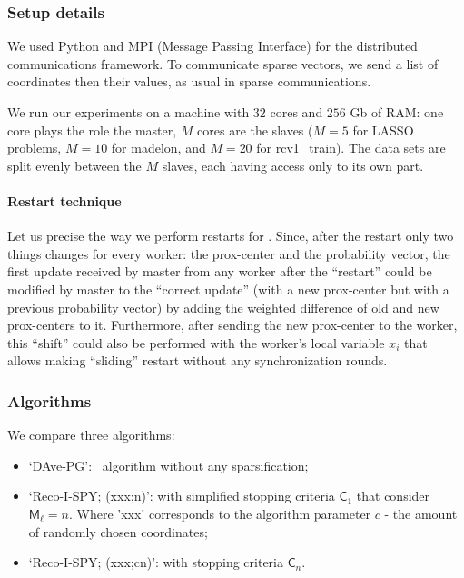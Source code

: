 \subsubsection{Setup details} We used Python and MPI (Message Passing Interface) for the distributed communications framework. To communicate sparse vectors, we send a list of coordinates then their values, as usual in sparse communications. 

We run our experiments on a machine with $32$ cores and $256$ Gb of RAM: one core plays the role the master, $M$ cores are the slaves ($M=5$ for LASSO problems, $M=10$ for madelon, and $M=20$ for rcv1\_train). The data sets are split evenly between the $M$ slaves, each having access only to its own part.%

\paragraph{Restart technique} Let us precise the way we perform restarts for \recoalgo. Since, after the restart only two things changes for every worker: the prox-center and the probability vector, the first update received by master from any worker after the ``restart'' could be modified by master to the ``correct update'' (with a new prox-center but with a previous probability vector) by adding the weighted difference of old and new prox-centers to it. Furthermore, after sending the new prox-center to the worker, this ``shift'' could also be performed with the worker's local variable $x_i$ that allows making ``sliding'' restart without any synchronization rounds.




\subsubsection{Algorithms} We compare three algorithms: 
\begin{itemize}
\item `DAve-PG': \dave~algorithm without any sparsification;
\item `Reco-I-SPY; (xxx;n)': \recoalgo with simplified stopping criteria $\mathsf{C}_1$ that consider $\mathsf{M}_\ell=n$. Where 'xxx' corresponds to the algorithm parameter $c$ - the amount of randomly chosen coordinates;
\item `Reco-I-SPY; (xxx;cn)': \recoalgo with stopping criteria $\mathsf{C}_n$.
\end{itemize}

